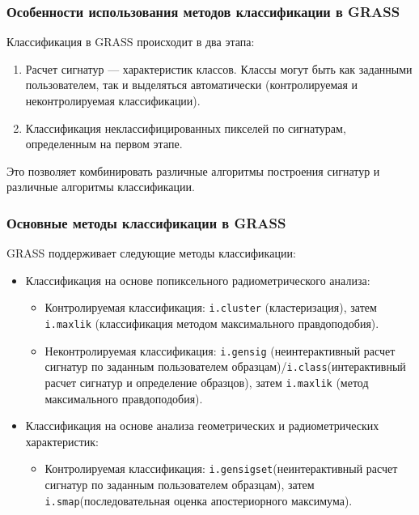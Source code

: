 \begin{frame}
    \frametitle{Особенности использования методов классификации в GRASS}
    Классификация в GRASS происходит в два этапа:
    \begin{enumerate}
        \item Расчет сигнатур --- характеристик классов. Классы могут быть как заданными пользователем, так и выделяться автоматически (контролируемая и неконтролируемая классификации).
        \item Классификация неклассифицированных пикселей по сигнатурам, определенным на первом этапе.
    \end{enumerate}

    Это позволяет комбинировать различные алгоритмы построения сигнатур и различные алгоритмы классификации.
\end{frame}

\begin{frame}
    \frametitle{Основные методы классификации в GRASS}
    GRASS поддерживает следующие методы классификации:
    \begin{itemize}
        \item Классификация на основе попиксельного радиометрического анализа:
            \begin{itemize}
                \item Контролируемая классификация:  \lstinline!i.cluster! (кластеризация), затем \lstinline!i.maxlik! (классификация методом максимального правдоподобия).
                \item Неконтролируемая классификация: \lstinline!i.gensig! (неинтерактивный расчет сигнатур по заданным пользователем образцам)/\lstinline!i.class!(интерактивный расчет сигнатур и определение образцов), затем \lstinline!i.maxlik! (метод максимального правдоподобия).
            \end{itemize}
        \item Классификация на основе анализа геометрических и радиометрических характеристик:
            \begin{itemize}
                \item Контролируемая классификация:  \lstinline!i.gensigset!(неинтерактивный расчет сигнатур по заданным пользователем образцам), затем \lstinline!i.smap!(последовательная оценка апостериорного максимума).
            \end{itemize}
    \end{itemize}
\end{frame}


